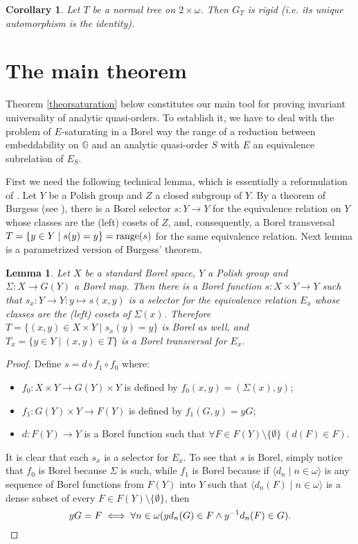 \documentclass{amsart}
\newtheorem{lemma}[theorem]{Lemma}
\newtheorem{corollary}[theorem]{Corollary}
\theoremstyle{definition}
\theoremstyle{remark}
\begin{document}
\begin{corollary}\label{cornontrivial}
 Let $T$ be a normal tree on $2 \times \omega$. Then $G_T$ is rigid (i.e. its unique automorphism is the identity).
\end{corollary}

\section{The main theorem}\label{sectionsaturation}

Theorem \ref{theorsaturation} below constitutes our main tool for
proving invariant universality of analytic quasi-orders.
To establish it, we have to deal with the problem of $E$-saturating in
a Borel way
the range of a reduction between embeddability on ${\mathbb{G}}$ and an
analytic quasi-order $S$ with $E$ an equivalence subrelation of
$E_S$.

First we need the following
technical lemma, which is essentially a reformulation of
\cite[Theorem 1.2.4]{beckerkechris}.
Let $Y$ be a Polish group and $Z$ a closed subgroup of $Y$.
By a theorem of Burgess (see \cite[Theorem 12.17]{Kechris1995}),
there is a Borel selector
$s\colon Y \to Y$ for the equivalence relation on $Y$ whose
classes are the (left) cosets of
$Z$, and, consequently, a Borel transversal $T= \{ y \in Y \mid
s(y)=y \} = {\rm range}(s)$ for the same
equivalence relation.
Next lemma is a parametrized version of Burgess' theorem.

\begin{lemma}\label{lemmaBurgess}
Let $X$ be a standard Borel space, $Y$ a Polish group and $\Sigma
\colon X \to G(Y)$ a Borel map. Then there is a Borel function $s \colon X \times
Y \to Y$ such that $s_x \colon Y \to Y  \colon y \mapsto s(x,y)$ is a
selector for the equivalence relation $E_x$ whose classes are the (left) cosets of $\Sigma(x)$. Therefore $T = \{ (x,y) \in X \times Y \mid s_x(y)
= y \}$ is Borel as well, and $T_x = \{ y \in Y \mid (x,y) \in T \}$ is
a Borel transversal for $E_x$.
\end{lemma}

\begin{proof}
Define $s = d \circ f_1 \circ f_0$ where:
\begin{itemize}
\item $f_0 \colon X\times Y \to G(Y)\times Y$ is defined by
  $f_0(x,y)=(\Sigma(x),y)$;
\item $f_1 \colon G(Y)\times Y \to F(Y)$ is defined by $f_1(G,y)=yG$;
\item $d \colon F(Y)\to Y$ is a Borel function such that $\forall F
  \in F(Y) \setminus \{\emptyset\}\ (d(F)\in F)$.
\end{itemize}

  It is clear that each $s_x$ is a selector for $E_x$. To see that $s$ is Borel, simply notice that $f_0$ is Borel because $\Sigma$ is such, while $f_1$ is Borel because if
$\langle d_n \mid n \in \omega \rangle$ is any sequence of Borel
functions from $F(Y)$ into $Y$ such that $\langle d_n (F) \mid n \in
\omega \rangle$ is a dense subset of every $F \in F(Y) \setminus \{ \emptyset \}$, then
\[
yG=F \iff \forall n \in \omega (y d_n(G) \in F \land y^{-1} d_n (F) \in G). \qedhere
\]
\end{proof}
\end{document}
